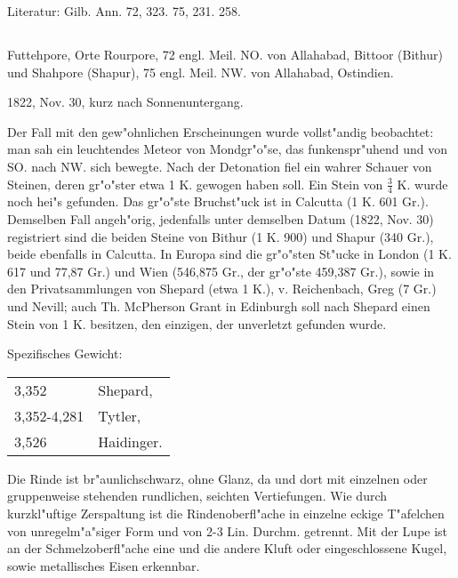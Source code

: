 \documentclass[a4paper, 11pt, oneside]{article}
\begin{document}
\normalsize
Literatur: Gilb. Ann. 72, 323. 75, 231. 258.
\subsection{}
\LARGE
\paragraph{}
Futtehpore, Orte Rourpore, 72 engl. Meil. NO. von Allahabad, Bittoor (Bithur) und Shahpore (Shapur), 75 engl. Meil. NW. von Allahabad, Ostindien.

1822, Nov. 30, kurz nach Sonnenuntergang.

Der Fall mit den gew"ohnlichen Erscheinungen wurde vollst"andig beobachtet: man sah ein leuchtendes Meteor von Mondgr"o"se, das funkenspr"uhend und von SO. nach NW. sich bewegte. Nach der Detonation fiel ein wahrer Schauer von Steinen, deren gr"o"ster etwa 1 K. gewogen haben soll. Ein Stein von $\mathfrak{\frac{3}{4}}$ K. wurde noch hei"s gefunden. Das gr"o"ste Bruchst"uck ist in Calcutta (1 K. 601 Gr.). Demselben Fall angeh"orig, jedenfalls unter demselben Datum (1822, Nov. 30) registriert sind die beiden Steine von Bithur (1 K. 900) und Shapur (340 Gr.), beide ebenfalls in Calcutta. In Europa sind die gr"o"sten St"ucke in London (1 K. 617 und 77,87 Gr.) und Wien (546,875 Gr., der gr"o"ste 459,387 Gr.), sowie in den Privatsammlungen von Shepard (etwa 1 K.), v. Reichenbach, Greg (7 Gr.) und Nevill; auch Th. McPherson Grant in Edinburgh soll nach Shepard einen Stein von 1 K. besitzen, den einzigen, der unverletzt gefunden wurde.

Spezifisches Gewicht:
\begin{table}[!ht]
    \centering\swabfamily\Large
    \begin{tabular}{l l}
        3,352 & Shepard,\\
        3,352-4,281 & Tytler,\\
        3,526 & Haidinger.
    \end{tabular}
\end{table}

Die Rinde ist br"aunlichschwarz, ohne Glanz, da und dort mit einzelnen oder gruppenweise stehenden rundlichen, seichten Vertiefungen. Wie durch kurzkl"uftige Zerspaltung ist die Rindenoberfl"ache in einzelne eckige T"afelchen von unregelm"a"siger Form und von 2-3 Lin. Durchm. getrennt. Mit der Lupe ist an der Schmelzoberfl"ache eine und die andere Kluft oder eingeschlossene Kugel, sowie metallisches Eisen erkennbar.
\end{document}
